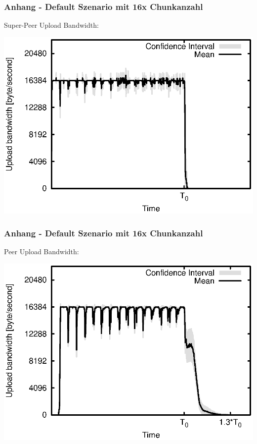 \begin{frame}
  \frametitle{Anhang - Default Szenario mit 16x Chunkanzahl}
  Super-Peer Upload Bandwidth:
  
  \begin{center}
    \includegraphics[width=1\textwidth]{fig/plots/scenario_17_chunk_count_fac_16/plots/GeneratedMeanCurrentSuperSeederUploadBandwidth.csv.eps}
  \end{center}
\end{frame}


\begin{frame}
  \frametitle{Anhang - Default Szenario mit 16x Chunkanzahl}
  Peer Upload Bandwidth:
  
  \begin{center}
    \includegraphics[width=1\textwidth]{fig/plots/scenario_17_chunk_count_fac_16/plots/GeneratedMeanCurrentUploadBandwidth.csv.eps}
  \end{center}
\end{frame}


